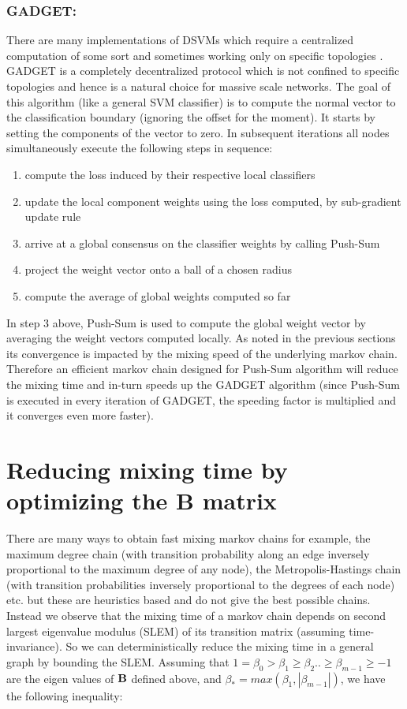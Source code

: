\documentclass[runningheads,a4paper]{llncs}
\begin{document}
\subsubsection{GADGET:}There are many implementations of DSVMs which require a centralized computation of some sort \cite{kokiopoulou2006distributed} and sometimes working only on specific topologies \cite{lu2008distributed}. GADGET \cite{Hensel_gadgetsvm} is a completely decentralized protocol which is not confined to specific topologies  and hence is a natural choice for massive scale networks. The goal of this algorithm (like a general SVM classifier) is to compute the normal vector to the classification boundary (ignoring the offset for the moment). It starts by setting the components of the vector to zero. In subsequent iterations all nodes simultaneously execute the following steps in sequence: 
\begin{enumerate}
\item compute the loss induced by their respective local classifiers
\item update the local component weights using the loss computed, by sub-gradient update rule
\item arrive at a global consensus on the classifier weights by calling Push-Sum
\item project the weight vector onto a ball of a chosen radius
\item compute the average of global weights computed so far 
\end{enumerate}
In step 3 above, Push-Sum is used to compute the global weight vector by averaging the weight vectors computed locally. As noted in the previous sections its convergence is impacted by the mixing speed of the underlying markov chain. Therefore an efficient markov chain designed for Push-Sum algorithm will reduce the mixing time and in-turn speeds up the GADGET algorithm (since Push-Sum is executed in every iteration of GADGET, the speeding factor is multiplied and it converges even more faster).

\section{Reducing mixing time by optimizing the B matrix}

There are many ways to obtain fast mixing markov chains for example, the maximum degree chain (with transition probability along an edge inversely proportional to the maximum degree of any node), the Metropolis-Hastings chain (with transition probabilities inversely proportional to the degrees of each node) etc. but these are heuristics based and do not give the best possible chains. Instead we observe that the mixing time of a markov chain depends on second largest eigenvalue modulus (SLEM) \cite{Boyd03fastestmixing} of its transition matrix (assuming time-invariance). So we can deterministically reduce the mixing time in a general graph by bounding the SLEM. Assuming that $1=\beta_0 > \beta_1 \geq \beta_2 .. \geq \beta_{m-1} \geq -1$ are the eigen values of $\bf B$ defined above, and $\beta_* = max(\beta_1,|\beta_{m-1}|)$, we have the following inequality:
\end{document}
